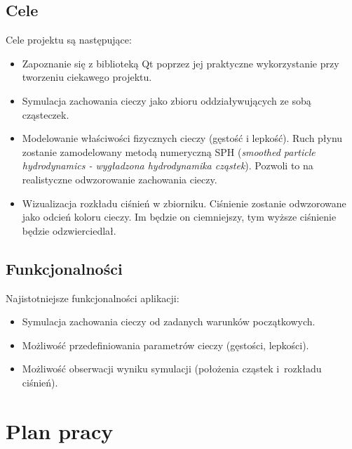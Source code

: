 \documentclass[a4paper]{article}
\begin{document}
\subsection{Cele}
Cele projektu są następujące:
\begin{itemize}
  \item Zapoznanie się z biblioteką Qt poprzez jej praktyczne wykorzystanie przy tworzeniu ciekawego projektu.
  \item Symulacja zachowania cieczy jako zbioru oddziaływujących ze sobą cząsteczek.
  \item Modelowanie właściwości fizycznych cieczy (gęstość i lepkość). 
        Ruch płynu zostanie zamodelowany metodą numeryczną SPH (\textit{smoothed particle hydrodynamics - wygładzona hydrodynamika cząstek}).
        Pozwoli to na realistyczne odwzorowanie zachowania cieczy.
  \item Wizualizacja rozkładu ciśnień w zbiorniku. 
        Ciśnienie zostanie odwzorowane jako odcień koloru cieczy.
        Im będzie on ciemniejszy, tym wyższe ciśnienie będzie odzwierciedlał.
\end{itemize}


\subsection{Funkcjonalności}

Najistotniejsze funkcjonalności aplikacji:
\begin{itemize}
  \item Symulacja zachowania cieczy od zadanych warunków początkowych.
  \item Możliwość przedefiniowania parametrów cieczy (gęstości, lepkości).
  \item Możliwość obserwacji wyniku symulacji (położenia cząstek i~rozkładu ciśnień).
\end{itemize}

\section{Plan pracy}
\end{document}
